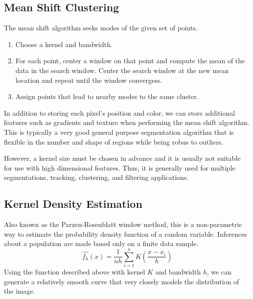 \documentclass{math}
\begin{document}
\subsection*{Mean Shift Clustering}
The mean shift algorithm seeks modes of the given set of points.
\begin{enumerate}
  \item Choose a kernel and bandwidth.
  \item For each point, center a window on that point and compute the mean of
    the data in the search window. Center the search window at the new mean
    location and repeat until the window convergess.
  \item Assign points that lead to nearby modes to the same cluster.
\end{enumerate}
In addition to storing each pixel's position and color, we can store additional
features such as gradients and texture when performing the mean shift algorithm.
This is typically a very good general purpose segmentation algorithm that is
flexible in the number and shape of regions while being robus to outliers. \par
However, a kernel size must be chosen in advance and it is usually not suitable
for use with high dimensional features. Thus, it is generally used for multiple
segmentations, tracking, clustering, and filtering applications.

\subsection*{Kernel Density Estimation}
Also known as the Parzen-Rosenblatt window method, this is a non-parametric way
to estimate the probability density function of a random variable. Inferences
about a population are made based only on a finite data sample.
\[ \hat{f_h}(x) = \frac{1}{nh}\sum_{i=1}^{n}K\left(\frac{x-x_i}{h}\right) \]
Using the function described above with kernel \( K \) and bandwidth \( h \),
we can generate a relatively smooth curve that very closely models
the distribution of the image.
\end{document}
